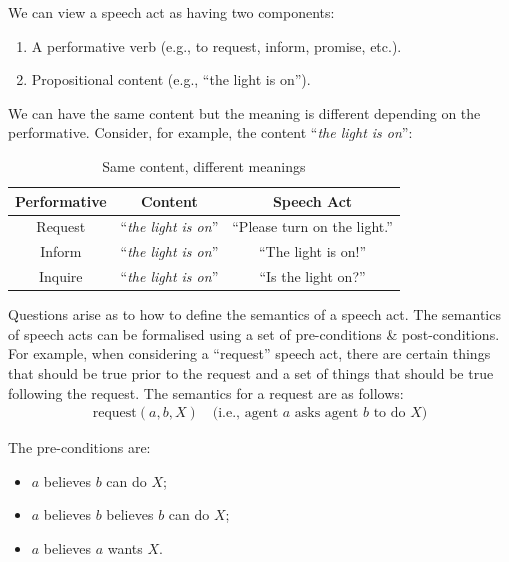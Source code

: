 \documentclass[a4paper,11pt]{article}
\begin{document}
We can view a speech act as having two components:
\begin{enumerate}
    \item   A performative verb (e.g., to request, inform, promise, etc.).
    \item   Propositional content (e.g., ``the light is on'').
\end{enumerate}

We can have the same content but the meaning is different depending on the performative.
Consider, for example, the content ``\textit{the light is on}'':

\begin{table}[H]
    \centering
    \begin{tabular}{|c|c|c|}
    \hline
    \textbf{Performative}   & \textbf{Content}          & \textbf{Speech Act} \\
    \hline
    Request                 & ``\textit{the light is on}''  & ``Please turn on the light.'' \\
    \hline
    Inform                  & ``\textit{the light is on}''  & ``The light is on!'' \\
    \hline
    Inquire                 & ``\textit{the light is on}''  & ``Is the light on?'' \\
    \hline
    \end{tabular}   
    \caption{Same content, different meanings}
\end{table}

Questions arise as to how to define the semantics of a speech act.
The semantics of speech acts can be formalised using a set of pre-conditions \& post-conditions.
For example, when considering a ``request'' speech act, there are certain things that should be true prior to the request and a set of things that should be true following the request.
The semantics for a request are as follows:
\begin{align*}
    \text{request}(a, b, X) \quad \text{(i.e., agent } a \text{ asks agent } b \text{ to do } X \text{)}
\end{align*}

The pre-conditions are:
\begin{itemize}
    \item   $a$ believes $b$ can do $X$;
    \item   $a$ believes $b$ believes $b$ can do $X$;
    \item   $a$ believes $a$ wants $X$.
\end{itemize}
\end{document}
